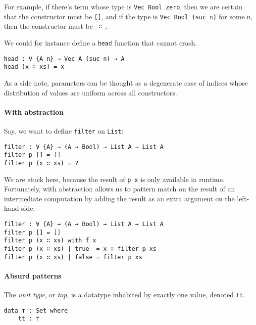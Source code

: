 \documentclass[../thesis.tex]{subfiles}
\begin{document}
For example, if there's term whose type is {\lstinline|Vec Bool zero|}, then
we are certain that the constructor must be {\lstinline|[]|}, and if the type
 is {\lstinline|Vec Bool (suc n)|} for some {\lstinline|n|}, then the constructor
must be {\lstinline|_∷_|}.

We could for instance define a {\lstinline|head|} function that cannot crash.

\begin{lstlisting}
head : ∀ {A n} → Vec A (suc n) → A
head (x ∷ xs) = x
\end{lstlisting}

As a side note, parameters can be thought as a degenerate case of indices whose
distribution of values are uniform across all constructors.

\paragraph{With abstraction}

Say, we want to define {\lstinline|filter|} on {\lstinline|List|}:

\begin{lstlisting}
filter : ∀ {A} → (A → Bool) → List A → List A
filter p [] = []
filter p (x ∷ xs) = ?
\end{lstlisting}

We are stuck here, because the result of {\lstinline|p x|} is only available in
runtime. Fortunately, with abstraction allows us to pattern match on the result
of an intermediate computation by adding the result as an extra argument on the
left-hand side:

\begin{lstlisting}
filter : ∀ {A} → (A → Bool) → List A → List A
filter p [] = []
filter p (x ∷ xs) with f x
filter p (x ∷ xs) | true  = x ∷ filter p xs
filter p (x ∷ xs) | false = filter p xs
\end{lstlisting}

\paragraph{Absurd patterns}

The \textit{unit type}, or \textit{top}, is a datatype inhabited by
exactly one value, denoted {\lstinline|tt|}.

\begin{lstlisting}
data ⊤ : Set where
    tt : ⊤
\end{lstlisting}
\end{document}
